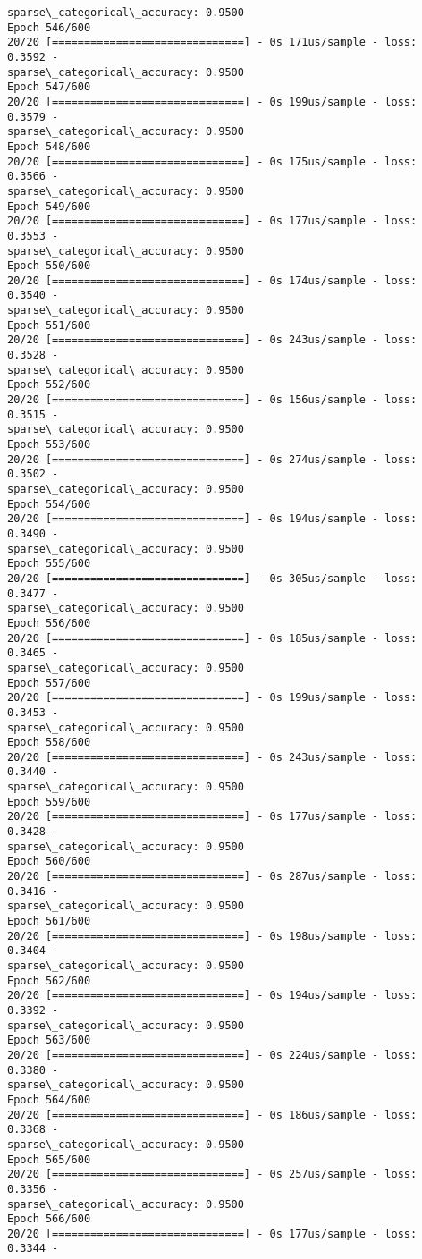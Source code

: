 \documentclass[11pt]{article}
\begin{document}
\begin{Verbatim}[commandchars=\\\{\}]
sparse\_categorical\_accuracy: 0.9500
Epoch 546/600
20/20 [==============================] - 0s 171us/sample - loss: 0.3592 -
sparse\_categorical\_accuracy: 0.9500
Epoch 547/600
20/20 [==============================] - 0s 199us/sample - loss: 0.3579 -
sparse\_categorical\_accuracy: 0.9500
Epoch 548/600
20/20 [==============================] - 0s 175us/sample - loss: 0.3566 -
sparse\_categorical\_accuracy: 0.9500
Epoch 549/600
20/20 [==============================] - 0s 177us/sample - loss: 0.3553 -
sparse\_categorical\_accuracy: 0.9500
Epoch 550/600
20/20 [==============================] - 0s 174us/sample - loss: 0.3540 -
sparse\_categorical\_accuracy: 0.9500
Epoch 551/600
20/20 [==============================] - 0s 243us/sample - loss: 0.3528 -
sparse\_categorical\_accuracy: 0.9500
Epoch 552/600
20/20 [==============================] - 0s 156us/sample - loss: 0.3515 -
sparse\_categorical\_accuracy: 0.9500
Epoch 553/600
20/20 [==============================] - 0s 274us/sample - loss: 0.3502 -
sparse\_categorical\_accuracy: 0.9500
Epoch 554/600
20/20 [==============================] - 0s 194us/sample - loss: 0.3490 -
sparse\_categorical\_accuracy: 0.9500
Epoch 555/600
20/20 [==============================] - 0s 305us/sample - loss: 0.3477 -
sparse\_categorical\_accuracy: 0.9500
Epoch 556/600
20/20 [==============================] - 0s 185us/sample - loss: 0.3465 -
sparse\_categorical\_accuracy: 0.9500
Epoch 557/600
20/20 [==============================] - 0s 199us/sample - loss: 0.3453 -
sparse\_categorical\_accuracy: 0.9500
Epoch 558/600
20/20 [==============================] - 0s 243us/sample - loss: 0.3440 -
sparse\_categorical\_accuracy: 0.9500
Epoch 559/600
20/20 [==============================] - 0s 177us/sample - loss: 0.3428 -
sparse\_categorical\_accuracy: 0.9500
Epoch 560/600
20/20 [==============================] - 0s 287us/sample - loss: 0.3416 -
sparse\_categorical\_accuracy: 0.9500
Epoch 561/600
20/20 [==============================] - 0s 198us/sample - loss: 0.3404 -
sparse\_categorical\_accuracy: 0.9500
Epoch 562/600
20/20 [==============================] - 0s 194us/sample - loss: 0.3392 -
sparse\_categorical\_accuracy: 0.9500
Epoch 563/600
20/20 [==============================] - 0s 224us/sample - loss: 0.3380 -
sparse\_categorical\_accuracy: 0.9500
Epoch 564/600
20/20 [==============================] - 0s 186us/sample - loss: 0.3368 -
sparse\_categorical\_accuracy: 0.9500
Epoch 565/600
20/20 [==============================] - 0s 257us/sample - loss: 0.3356 -
sparse\_categorical\_accuracy: 0.9500
Epoch 566/600
20/20 [==============================] - 0s 177us/sample - loss: 0.3344 -

\end{Verbatim}
\end{document}
